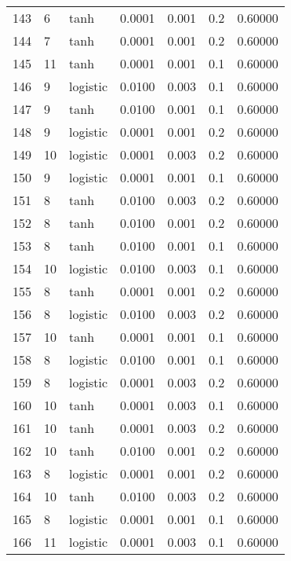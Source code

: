 \begin{tabular}{lllrrrr}
143 &           6 &      tanh &  0.0001 &  0.001 &  0.2 &   0.60000 \\
144 &           7 &      tanh &  0.0001 &  0.001 &  0.2 &   0.60000 \\
145 &          11 &      tanh &  0.0001 &  0.001 &  0.1 &   0.60000 \\
146 &           9 &  logistic &  0.0100 &  0.003 &  0.1 &   0.60000 \\
147 &           9 &      tanh &  0.0100 &  0.001 &  0.1 &   0.60000 \\
148 &           9 &  logistic &  0.0001 &  0.001 &  0.2 &   0.60000 \\
149 &          10 &  logistic &  0.0001 &  0.003 &  0.2 &   0.60000 \\
150 &           9 &  logistic &  0.0001 &  0.001 &  0.1 &   0.60000 \\
151 &           8 &      tanh &  0.0100 &  0.003 &  0.2 &   0.60000 \\
152 &           8 &      tanh &  0.0100 &  0.001 &  0.2 &   0.60000 \\
153 &           8 &      tanh &  0.0100 &  0.001 &  0.1 &   0.60000 \\
154 &          10 &  logistic &  0.0100 &  0.003 &  0.1 &   0.60000 \\
155 &           8 &      tanh &  0.0001 &  0.001 &  0.2 &   0.60000 \\
156 &           8 &  logistic &  0.0100 &  0.003 &  0.2 &   0.60000 \\
157 &          10 &      tanh &  0.0001 &  0.001 &  0.1 &   0.60000 \\
158 &           8 &  logistic &  0.0100 &  0.001 &  0.1 &   0.60000 \\
159 &           8 &  logistic &  0.0001 &  0.003 &  0.2 &   0.60000 \\
160 &          10 &      tanh &  0.0001 &  0.003 &  0.1 &   0.60000 \\
161 &          10 &      tanh &  0.0001 &  0.003 &  0.2 &   0.60000 \\
162 &          10 &      tanh &  0.0100 &  0.001 &  0.2 &   0.60000 \\
163 &           8 &  logistic &  0.0001 &  0.001 &  0.2 &   0.60000 \\
164 &          10 &      tanh &  0.0100 &  0.003 &  0.2 &   0.60000 \\
165 &           8 &  logistic &  0.0001 &  0.001 &  0.1 &   0.60000 \\
166 &          11 &  logistic &  0.0001 &  0.003 &  0.1 &   0.60000 \\

\end{tabular}
